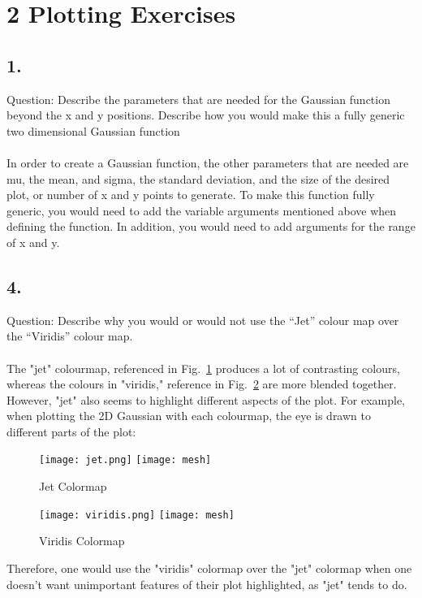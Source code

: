 \documentclass[12pt, letterpaper]{article}
\begin{document}
\section*{2 Plotting Exercises}

\subsection*{   1.}
Question: Describe the parameters that are needed for the Gaussian function
beyond the x and y positions. Describe how you would make this a fully generic two dimensional Gaussian function\\
\\
In order to create a Gaussian function, the other parameters that are needed are mu, the mean, and sigma, the standard deviation, and the size of the desired plot, or number of x and y points to generate. To make this function fully generic, you would need to add the variable arguments mentioned above when defining the function. In addition, you would need to add arguments for the range of x and y. 
\subsection*{   4.}
Question: Describe why you would or would
not use the “Jet” colour map over the “Viridis” colour map.\\
\\
The "jet" colourmap, referenced in Fig.~\ref{fig:mesh2} produces a lot of contrasting colours, whereas the colours in "viridis," reference in Fig.~\ref{fig:mesh3} are more blended together. However, "jet" also seems to highlight different aspects of the plot. For example, when plotting the 2D Gaussian with each colourmap, the eye is drawn to different parts of the plot: 
\begin{figure}[H]
\texttt{[image: jet.png]}
\centering
    \texttt{[image: mesh]}
    \caption{Jet Colormap}
    \label{fig:mesh2}
\end{figure}
\begin{figure}[H]
\texttt{[image: viridis.png]}
\centering
    \texttt{[image: mesh]}
    \caption{Viridis Colormap}
    \label{fig:mesh3}
\end{figure}
Therefore, one would use the "viridis" colormap over the "jet" colormap when one doesn't want unimportant features of their plot highlighted, as "jet" tends to do. 
\end{document}
